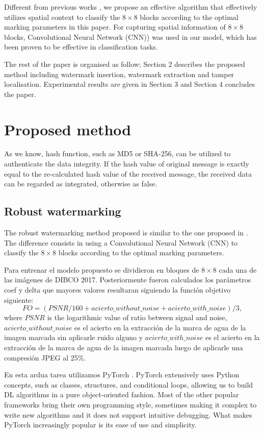 \documentclass[runningheads]{llncs}
\begin{document}
Different from previous works \cite{avila2018watermarking}, we propose an effective algorithm that effectively utilizes spatial context to classify the $8\times 8$ blocks according to the optimal marking parameters in this paper. For capturing spatial information of $8\times 8$ blocks, Convolutional Neural Network (CNN)) was used in our model, which has been proven to be effective in classification tasks.

The rest of the paper is organised as follow; Section 2 describes the proposed method including watermark insertion, watermark extraction and tamper localisation. Experimental results are given in Section 3 and Section 4 concludes the paper.

\section{Proposed method}
As we know, hash function, such as MD5 or SHA-256, can be utilized to authenticate the data integrity. If the hash value of original message is exactly equal to the re-calculated hash value of the received message, the received data can be regarded as integrated, otherwise as false.

\subsection{Robust watermarking}
The robust watermarking method proposed is similar to the one proposed in \cite{avila2018watermarking}. The difference consists in using a Convolutional Neural Network (CNN) to classify the $8\times 8$ blocks according to the optimal marking parameters.

Para entrenar el modelo propuesto se dividieron en bloques de $8\times 8$ cada una de las imágenes de DIBCO 2017. Posteriormente fueron calculados los parámetros coef y delta que mayores valores resultaran siguiendo la función objetivo siguiente:
\begin{equation}
FO = (PSNR/160 + acierto{\_}without{\_}noise + acierto{\_}with{\_}noise)/3,
\label{FA}
\end{equation}
where $PSNR$ is the logarithmic value of ratio between signal and noise, 
$ acierto{\_}without{\_}noise $ es el acierto en la extracción de la marca de agua de la imagen marcada sin aplicarle ruido alguno y $ acierto{\_}with{\_}noise $ es el acierto en la extracción de la marca de agua de la imagen marcada luego de aplicarle una compresión JPEG al 25{\%}.

En esta ardua tarea utilizamos PyTorch \cite{paszke2017pytorch}. PyTorch extensively uses Python concepts, such as classes, structures, and conditional loops, allowing us to build DL algorithms in a pure object-oriented fashion. Most of the other popular frameworks bring their own programming style, sometimes making it
complex to write new algorithms and it does not support intuitive debugging. What makes PyTorch increasingly popular is its ease of use and simplicity. \cite{Subramanian2018}
\end{document}
